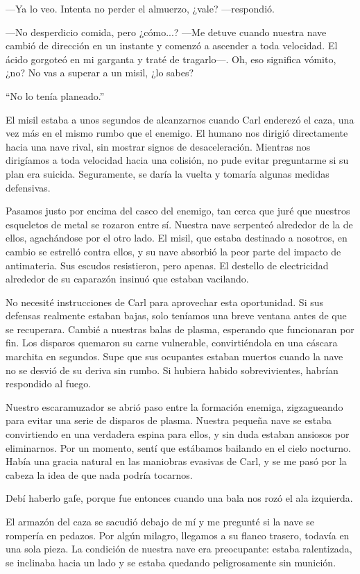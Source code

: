 —Ya lo veo. Intenta no perder el almuerzo, ¿vale? —respondió.

—No desperdicio comida, pero ¿cómo...? —Me detuve cuando nuestra nave cambió de dirección en un instante y comenzó a ascender a toda velocidad. El ácido gorgoteó en mi garganta y traté de tragarlo—. Oh, eso significa vómito, ¿no? No vas a superar a un misil, ¿lo sabes?

``No lo tenía planeado.''

El misil estaba a unos segundos de alcanzarnos cuando Carl enderezó el caza, una vez más en el mismo rumbo que el enemigo. El humano nos dirigió directamente hacia una nave rival, sin mostrar signos de desaceleración. Mientras nos dirigíamos a toda velocidad hacia una colisión, no pude evitar preguntarme si su plan era suicida. Seguramente, se daría la vuelta y tomaría algunas medidas defensivas.

Pasamos justo por encima del casco del enemigo, tan cerca que juré que nuestros esqueletos de metal se rozaron entre sí. Nuestra nave serpenteó alrededor de la de ellos, agachándose por el otro lado. El misil, que estaba destinado a nosotros, en cambio se estrelló contra ellos, y su nave absorbió la peor parte del impacto de antimateria. Sus escudos resistieron, pero apenas. El destello de electricidad alrededor de su caparazón insinuó que estaban vacilando.

No necesité instrucciones de Carl para aprovechar esta oportunidad. Si sus defensas realmente estaban bajas, solo teníamos una breve ventana antes de que se recuperara. Cambié a nuestras balas de plasma, esperando que funcionaran por fin. Los disparos quemaron su carne vulnerable, convirtiéndola en una cáscara marchita en segundos. Supe que sus ocupantes estaban muertos cuando la nave no se desvió de su deriva sin rumbo. Si hubiera habido sobrevivientes, habrían respondido al fuego.

Nuestro escaramuzador se abrió paso entre la formación enemiga, zigzagueando para evitar una serie de disparos de plasma. Nuestra pequeña nave se estaba convirtiendo en una verdadera espina para ellos, y sin duda estaban ansiosos por eliminarnos. Por un momento, sentí que estábamos bailando en el cielo nocturno. Había una gracia natural en las maniobras evasivas de Carl, y se me pasó por la cabeza la idea de que nada podría tocarnos.

Debí haberlo gafe, porque fue entonces cuando una bala nos rozó el ala izquierda.

El armazón del caza se sacudió debajo de mí y me pregunté si la nave se rompería en pedazos. Por algún milagro, llegamos a su flanco trasero, todavía en una sola pieza. La condición de nuestra nave era preocupante: estaba ralentizada, se inclinaba hacia un lado y se estaba quedando peligrosamente sin munición.

